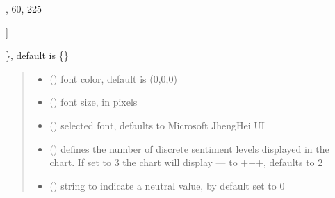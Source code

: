 \documentclass[letterpaper,10pt,english]{sphinxmanual}
\begin{document}
\begin{fulllineitems}
\begin{quote}
\begin{description}
\begin{itemize}
\end{itemize}

\end{description}\end{quote}
\begin{description}
\begin{description}
\sphinxlineitem{\{}\begin{description}
\sphinxlineitem{“United States”: {[}}
,
60,
225

\end{description}

\sphinxAtStartPar
{]}

\end{description}

\sphinxAtStartPar
\}, default is \{\}

\end{description}
\begin{quote}\begin{description}
\begin{itemize}
\item {} 
\sphinxAtStartPar
{} () \textendash{} font color, default is (0,0,0)

\item {} 
\sphinxAtStartPar
{} () \textendash{} font size, in pixels

\item {} 
\sphinxAtStartPar
{} () \textendash{} selected font, defaults to Microsoft JhengHei UI

\item {} 
\sphinxAtStartPar
{} () \textendash{} defines the number of discrete sentiment levels displayed in the chart. If set to 3 the chart will display — to +++, defaults to 2

\item {} 
\sphinxAtStartPar
{} () \textendash{} string to indicate a neutral value, by default set to 0


\end{itemize}
\end{description}
\end{quote}
\end{fulllineitems}
\end{document}
